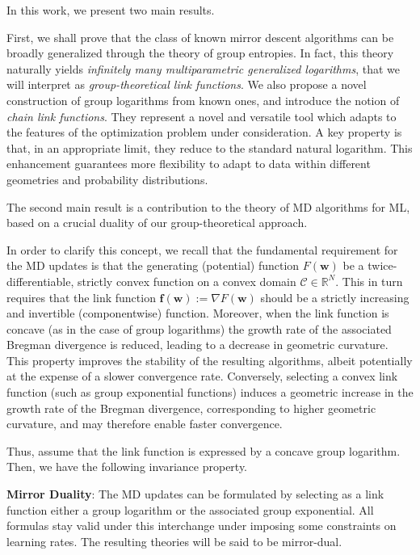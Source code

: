 \documentclass[10pt]{amsart}
\newcommand{\bof}{\boldsymbol{f}}
\newcommand{\R}{\mathbb{R}}
\newcommand{\bw}{\boldsymbol{w}}
\theoremstyle{definition}
\theoremstyle{definition}	 %
\begin{document}
In this work, we present two main results.

First, we shall prove that the class of known mirror descent algorithms can be broadly generalized through the theory of group entropies. In fact, this theory naturally yields \textit{infinitely many multiparametric
generalized logarithms}, that we will interpret as \textit{group-theoretical link functions}. We also propose a novel construction of group logarithms from known ones, and introduce the notion of \textit{chain link functions}. They represent a novel and versatile tool which adapts to the features of the optimization problem under consideration. A key property is that, in an appropriate limit, they reduce to the standard natural logarithm.
This enhancement guarantees more flexibility to adapt to data within different geometries and probability distributions.

\vspace{2mm}




The second main result is a contribution to the theory of MD algorithms for ML, based on a crucial duality of our group-theoretical approach.

In order to clarify this concept, we recall that the fundamental requirement for the MD updates is that the generating (potential) function $F(\bw)$ be a twice-differentiable, strictly convex function on a convex domain $\mathcal{C}\in \R^{N}$. This in turn requires that the link function $\bof(\bw):=\nabla F(\bw)$ should be a strictly increasing and invertible (componentwise) function.
Moreover, when the link function is concave (as in the case of group logarithms) the growth rate of the associated Bregman divergence is reduced, leading to a decrease in geometric curvature. This property improves the stability of the resulting algorithms, albeit potentially at the expense of a slower convergence rate. Conversely, selecting a convex link function (such as group exponential functions) induces a geometric increase in the growth rate of the Bregman divergence, corresponding to higher geometric curvature, and may therefore enable faster convergence.


Thus, assume that the link function is expressed by a concave group logarithm. Then, we have the following invariance property.

\vspace{2mm}

\textbf{Mirror Duality}: The MD updates can be formulated by selecting as a link function either a group logarithm or the associated group exponential. All formulas stay valid under this interchange under imposing some constraints on learning rates. The resulting theories will be said to be mirror-dual.
\end{document}
